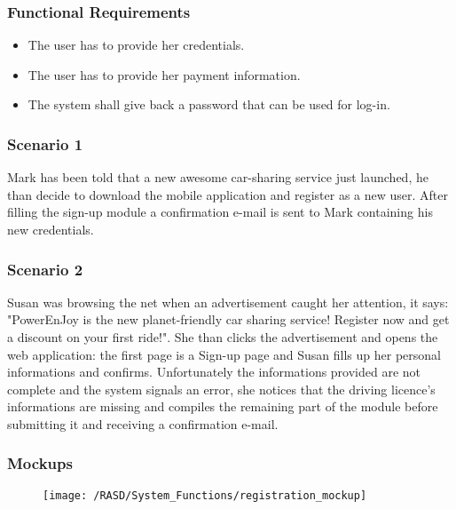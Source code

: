 \subsubsection{Functional Requirements}
\begin{itemize}
  \item The user has to provide her credentials. 
  \item The user has to provide her payment information.
  \item The system shall give back a password that can be used for log-in.
\end{itemize}


\subsubsection{Scenario 1}
Mark has been told that a new awesome car-sharing service just launched, he than decide to download the mobile application and register as a new user. After filling the sign-up module a confirmation e-mail is sent to Mark containing his new credentials.


\subsubsection{Scenario 2}
Susan was browsing the net when an advertisement caught her attention, it says: "PowerEnJoy is the new planet-friendly car sharing service! Register now and get a discount on your first ride!". She than clicks the advertisement and opens the web application: the first page is a Sign-up page and Susan fills up her personal informations and confirms. Unfortunately the informations provided are not complete and the system signals an error, she notices that the driving licence's informations are missing and compiles the remaining part of the module before submitting it and receiving a confirmation e-mail.


\subsubsection{Mockups}
\begin{figure}[!ht]
  \centering
  \vspace{0.2cm}
  \texttt{[image: /RASD/System\_Functions/registration\_mockup]}\\
  \vspace{0.4cm}
  \label{fig:registration_mockup} 
\end{figure}


